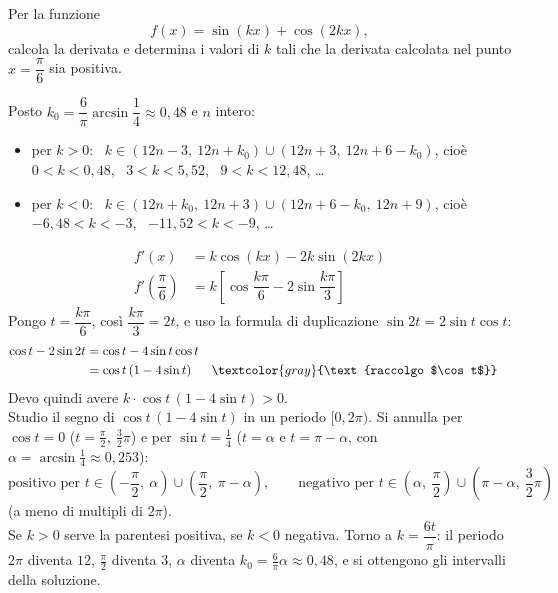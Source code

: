 \begin{question}[ID=4.3, subtitle={Derivata di $\sin(kx)+\cos(2kx)$ positiva in $x=\pi/6$}, tags={derivate, parametrico}, difficulty=media]
Per la funzione
\[
f(x) = \sin(kx) + \cos(2kx),
\]
calcola la derivata e determina i valori di \( k \) tali che la derivata calcolata nel punto \( x = \dfrac{\pi}{6} \) sia positiva.
\begin{solution}
Posto $k_0=\dfrac6\pi\arcsin\dfrac14\approx0{,}48$ e $n$ intero:
\begin{itemize}
    \item per $k>0$: \ $k\in(12n-3,\ 12n+k_0)\cup(12n+3,\ 12n+6-k_0)$, cioè $0<k<0{,}48$, \ $3<k<5{,}52$, \ $9<k<12{,}48$, \ldots
    \item per $k<0$: \ $k\in(12n+k_0,\ 12n+3)\cup(12n+6-k_0,\ 12n+9)$, cioè $-6{,}48<k<-3$, \ $-11{,}52<k<-9$, \ldots
\end{itemize}
\end{solution}
\begin{explanation}
\[\begin{aligned}
f'(x) &= k\cos(kx)-2k\sin(2kx)\\
f'\left(\dfrac\pi6\right) &= k\left[\cos\dfrac{k\pi}{6}-2\sin\dfrac{k\pi}{3}\right]
\end{aligned}\]
Pongo $t=\dfrac{k\pi}{6}$, così $\dfrac{k\pi}{3}=2t$, e uso la formula di duplicazione $\sin2t=2\sin t\cos t$:
\[\begin{aligned}
\cos t-2\sin2t &= \cos t-4\sin t\cos t\\
&= \cos t\,(1-4\sin t) && \textcolor{gray}{\text{raccolgo $\cos t$}}
\end{aligned}\]
Devo quindi avere $k\cdot\cos t\,(1-4\sin t)>0$. \\
Studio il segno di $\cos t\,(1-4\sin t)$ in un periodo $[0,2\pi)$. Si annulla per $\cos t=0$ ($t=\tfrac\pi2,\ \tfrac32\pi$) e per $\sin t=\tfrac14$ ($t=\alpha$ e $t=\pi-\alpha$, con $\alpha=\arcsin\tfrac14\approx0{,}253$):
\[ \text{positivo per } t\in\left(-\dfrac\pi2,\ \alpha\right)\cup\left(\dfrac\pi2,\ \pi-\alpha\right), \qquad \text{negativo per } t\in\left(\alpha,\ \dfrac\pi2\right)\cup\left(\pi-\alpha,\ \dfrac32\pi\right) \]
(a meno di multipli di $2\pi$). \\
Se $k>0$ serve la parentesi positiva, se $k<0$ negativa. Torno a $k=\dfrac{6t}{\pi}$: il periodo $2\pi$ diventa $12$, $\tfrac\pi2$ diventa $3$, $\alpha$ diventa $k_0=\tfrac6\pi\alpha\approx0{,}48$, e si ottengono gli intervalli della soluzione.
\end{explanation}
\end{question}

